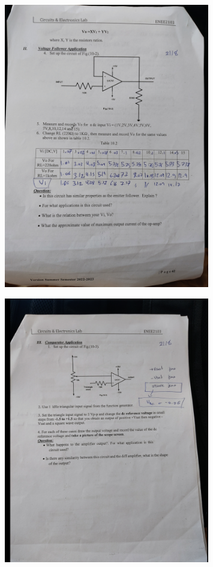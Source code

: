 \documentclass[12pt]{article}
\begin{document}
\begin{figure}[H]
    \centering
    \includegraphics[width=0.8\textwidth]{assets//main/2023-08-27-23-45-46.png}

\end{figure}
\clearpage
\begin{figure}[H]
    \centering  
    \includegraphics[width=0.8\textwidth]{assets//main/2023-08-27-23-44-51.png}
\end{figure}
\end{document}
